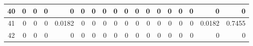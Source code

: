 \begin{table}[ht]
\begin{adjustbox}{width = \textwidth, center}
\begin{tabular}{|c|r|r|r|r|r|r|r|r|r|r|r|r|r|r|r|r|r|}
            \rowcolor[HTML]{FFFFFF} 
            \cellcolor[HTML]{CFE2F3}40                           & 0                                              & 0                                              & 0                                              & 0                                              & 0                                              & 0                                              & 0                                              & 0                                               & 0                                               & 0                                               & 0                                               & 0                                               & 0                                               & 0                                               & 0                                               & \cellcolor[HTML]{D9D2E9}0                                                             & \cellcolor[HTML]{D9D2E9}0                                                                 \\ \hline
            \rowcolor[HTML]{FFFFFF} 
            \cellcolor[HTML]{CFE2F3}41                           & 0                                              & 0                                              & 0                                              & \cellcolor[HTML]{C7E9D8}0.0182                 & 0                                              & 0                                              & 0                                              & 0                                               & 0                                               & 0                                               & 0                                               & 0                                               & 0                                               & 0                                               & 0                                               & \cellcolor[HTML]{D9D2E9}0.0182                                                        & \cellcolor[HTML]{D9D2E9}0.7455                                                            \\ \hline
            \rowcolor[HTML]{FFFFFF} 
            \cellcolor[HTML]{CFE2F3}42                           & 0                                              & 0                                              & 0                                              & 0                                              & 0                                              & 0                                              & 0                                              & 0                                               & 0                                               & 0                                               & 0                                               & 0                                               & 0                                               & 0                                               & 0                                               & \cellcolor[HTML]{D9D2E9}0                                                             & \cellcolor[HTML]{D9D2E9}0                                                                 \\ \hline

\end{tabular}
\end{adjustbox}
\end{table}
